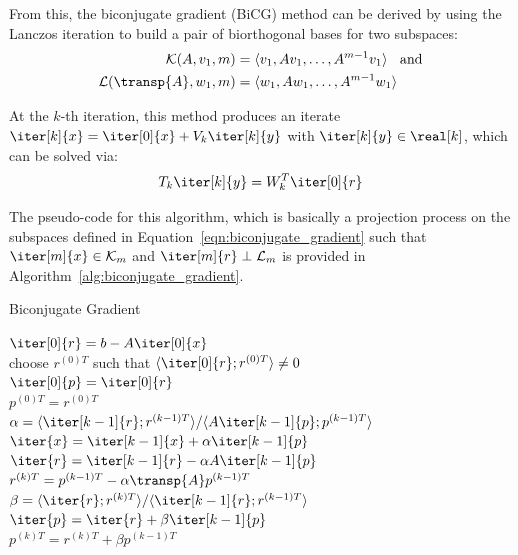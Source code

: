 \noindent From this, the biconjugate gradient (BiCG) method can be derived by using the Lanczos iteration to build a pair of biorthogonal bases for two subspaces:
\begin{equation}
\label{eqn:biconjugate_gradient}
    \begin{aligned}
    \mathcal{K}(A,v_1,m) &= \langle v_1, Av_1, \dots, A^{m-1}v_1\rangle \;\; \text{ and}\\
    \mathcal{L}(\transp{A},w_1,m) &= \langle w_1, Aw_1, \dots, A^{m-1}w_1 \rangle
    \end{aligned}
\end{equation}

\noindent At the $k$-th iteration, this method produces an iterate $\iter[k]{x}=\iter[0]{x}+V_k\iter[k]{y}$ with $\iter[k]{y} \in \real[k]$, which can be solved via:
\begin{equation}
    T_k\iter[k]{y}=W_k^T\iter[0]{r}
\end{equation}

\noindent The pseudo-code for this algorithm, which is basically a projection process on the subspaces defined in Equation~\hyperref[eqn:biconjugate_gradient]{\ref{eqn:biconjugate_gradient}} such that $\iter[m]{x} \in \mathcal{K}_m$ and $\iter[m]{r} \perp \mathcal{L}_m$ is provided in Algorithm~\hyperref[alg:biconjugate_gradient]{\ref{alg:biconjugate_gradient}}.

\begin{algorithm}[h]
  \caption{Biconjugate Gradient}
  \label{alg:biconjugate_gradient}
  \SetAlgoLined
  \DontPrintSemicolon
  $\iter[0]{r} = b-A\iter[0]{x}$ \\
  choose $r^{(0)T}$ such that $\langle \iter[0]{r}; r^{(0)T}\rangle \neq 0$\\
  $\iter[0]{p} = \iter[0]{r}$ \\
  $p^{(0)T} = r^{(0)T}$ \\
   {
    $\alpha = \langle \iter[k-1]{r};r^{(k-1)T} \rangle / \langle A\iter[k-1]{p};p^{(k-1)T} \rangle$ \\
    $\iter{x} = \iter[k-1]{x}+\alpha \iter[k-1]{p}$ \\
    $\iter{r} = \iter[k-1]{r} - \alpha A\iter[k-1]{p}$ \\
    $r^{(k)T} = p^{(k-1)T} -\alpha \transp{A} p^{(k-1)T}$ \\
    $\beta = \langle \iter{r};r^{(k)T} \rangle / \langle \iter[k-1]{r};r^{(k-1)T} \rangle$ \\
    $\iter{p} = \iter{r} + \beta \iter[k-1]{p}$ \\
    $p^{(k)T} = r^{(k)T} + \beta p^{(k-1)T}$ \\
  }
\end{algorithm}

